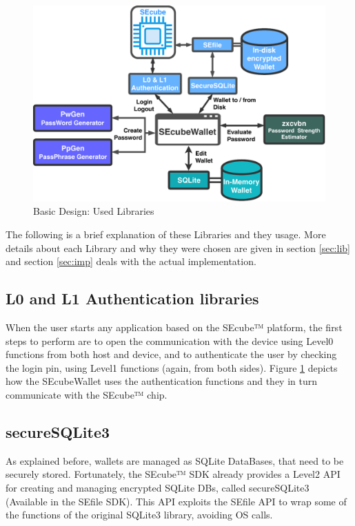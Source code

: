 \begin{figure}[ht]
	\centering
	\includegraphics[width=\textwidth]{chapters/figures/development/BasicDesign.pdf}
	\caption{Basic Design: Used Libraries}
	\label{fig:BasicDesign}
\end{figure}

The following is a brief explanation of these Libraries and they usage. More details about each Library and why they were chosen are given in section \ref{sec:lib} and section \ref{sec:imp} deals with the actual implementation.

\subsection{L0 and L1 Authentication libraries}

When the user starts any application based on the SEcube™ platform, the first steps to perform are to open the communication with the device using Level0 functions from both host and device, and to authenticate the user by checking the login pin, using Level1 functions (again, from both sides). Figure \ref{fig:BasicDesign} depicts how the SEcubeWallet uses the authentication functions and they in turn communicate with the SEcube™ chip.

\subsection{secureSQLite3}
As explained before, wallets are managed as SQLite DataBases, that need to be securely stored. Fortunately, the SEcube™ SDK already provides a Level2 API for creating and managing encrypted SQLite DBs, called secureSQLite3 (Available in the SEfile SDK\cite{SEcubeRes}). This API exploits the SEfile API to wrap some of the functions of the original SQLite3 library, avoiding OS calls.

